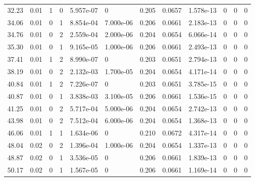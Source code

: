 \documentclass[preview]{standalone}
\begin{document}
{{\begin{tabular}{L{1.2cm}C{1.2cm} C{0.3cm}C{0.5cm} C{1.4cm}C{1.4cm} C{1.4cm}C{1.4cm} C{1.6cm}C{1.6cm} C{1.6cm}C{1.6cm}}
  32.23  &  0.01  & 1     &  0 &  5.957e-07  & 0  &  0.205&   0.0657& 1.578e-13 & 0   &  0 & 0  \\ 
  34.06  &  0.01  & 0     &  1 &  8.854e-04  & 7.000e-06  &  0.206&   0.0661& 2.183e-13 & 0   &  0 & 0  \\ 
  34.76  &  0.01  & 0     &  2 &  2.559e-04  & 2.000e-06  &  0.204&   0.0654& 6.066e-14 & 0   &  0 & 0  \\ 
  35.30  &  0.01  & 0     &  1 &  9.165e-05  & 1.000e-06  &  0.206&   0.0661& 2.493e-13 & 0   &  0 & 0  \\ 
  37.41  &  0.01  & 1     &  2 &  8.990e-07  & 0  &  0.203&   0.0651& 2.794e-13 & 0   &  0 & 0  \\ 
  38.19  &  0.01  & 0     &  2 &  2.132e-03  & 1.700e-05  &  0.204&   0.0654& 4.171e-14 & 0   &  0 & 0  \\ 
  40.84  &  0.01  & 1     &  2 &  7.226e-07  & 0  &  0.203&   0.0651& 3.785e-15 & 0   &  0 & 0  \\ 
  40.87  &  0.01  & 0     &  1 &  3.838e-03  & 3.100e-05  &  0.206&   0.0661& 1.536e-15 & 0   &  0 & 0  \\ 
  41.25  &  0.01  & 0     &  2 &  5.717e-04  & 5.000e-06  &  0.204&   0.0654& 2.742e-13 & 0   &  0 & 0  \\ 
  43.98  &  0.01  & 0     &  2 &  7.512e-04  & 6.000e-06  &  0.204&   0.0654& 1.368e-13 & 0   &  0 & 0  \\ 
  46.06  &  0.01  & 1     &  1 &  1.634e-06  & 0  &  0.210&   0.0672& 4.317e-14 & 0   &  0 & 0  \\ 
  48.04  &  0.02  & 0     &  2 &  1.396e-04  & 1.000e-06  &  0.204&   0.0654& 1.337e-13 & 0   &  0 & 0  \\ 
  48.87  &  0.02  & 0     &  1 &  3.536e-05  & 0  &  0.206&   0.0661& 1.839e-13 & 0   &  0 & 0  \\ 
  50.17  &  0.02  & 0     &  1 &  1.567e-05  & 0  &  0.206&   0.0661& 1.169e-14 & 0   &  0 & 0  \\ 
\hline 
\end{tabular} 

}}
\end{document}
